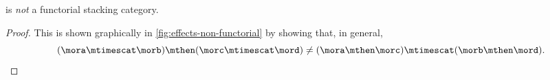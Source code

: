 \begin{lemma}
    \Effects is \emph{not} a functorial stacking category.
\end{lemma}

\begin{proof}
    This is shown graphically in \cref{fig:effects-non-functorial} by showing that, in general,
    \begin{equation}
        (\mora \mtimescat \morb )
        \mthen (\morc \mtimescat \mord )
        \neq
        (\mora \mthen \morc ) \mtimescat (\morb \mthen \mord ).
    \end{equation}
\end{proof}

\begin{figure*}[b]
    \centering
    \caption{Proof that \Effects is not a functorial stacking category by showing that
        the two morphisms above have different representations in \SetStar.}
    \label{fig:effects-not-functorial}
\end{figure*}